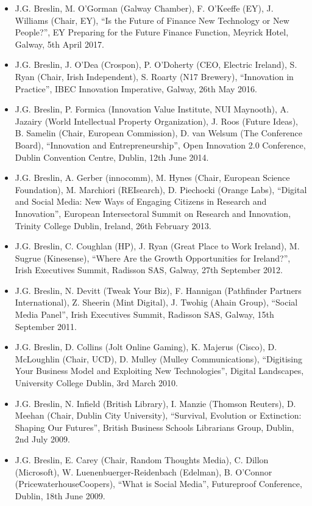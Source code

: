 \documentclass[10pt,a4paper]{res} %
\begin{document}
\begin{resume}
\begin{itemize}
\item J.G. Breslin, M. O'Gorman (Galway Chamber), F. O'Keeffe (EY), J. Williams (Chair, EY), ``Is the Future of Finance New Technology or New People?'', EY Preparing for the Future Finance Function, Meyrick Hotel, Galway, 5th April 2017.
\item J.G. Breslin, J. O'Dea (Crospon), P. O'Doherty (CEO, Electric Ireland), S. Ryan (Chair, Irish Independent), S. Roarty (N17 Brewery), ``Innovation in Practice'', IBEC Innovation Imperative, Galway, 26th May 2016.
\item J.G. Breslin, P. Formica (Innovation Value Institute, NUI Maynooth), A. Jazairy (World Intellectual Property Organization), J. Roos (Future Ideas), B. Samelin (Chair, European Commission), D. van Welsum (The Conference Board), ``Innovation and Entrepreneurship'', Open Innovation 2.0 Conference, Dublin Convention Centre, Dublin, 12th June 2014.
\item J.G. Breslin, A. Gerber (innocomm), M. Hynes (Chair, European Science Foundation), M. Marchiori (REIsearch), D. Piechocki (Orange Labs), ``Digital and Social Media: New Ways of Engaging Citizens in Research and Innovation'', European Intersectoral Summit on Research and Innovation, Trinity College Dublin, Ireland, 26th February 2013.
\item J.G. Breslin, C. Coughlan (HP), J. Ryan (Great Place to Work Ireland), M. Sugrue (Kinesense), ``Where Are the Growth Opportunities for Ireland?'', Irish Executives Summit, Radisson SAS, Galway, 27th September 2012.
\item J.G. Breslin, N. Devitt (Tweak Your Biz), F. Hannigan (Pathfinder Partners International), Z. Sheerin (Mint Digital), J. Twohig (Ahain Group), ``Social Media Panel'', Irish Executives Summit, Radisson SAS, Galway, 15th September 2011.
\item J.G. Breslin, D. Collins (Jolt Online Gaming), K. Majerus (Cisco), D. McLoughlin (Chair, UCD), D. Mulley (Mulley Communications), ``Digitising Your Business Model and Exploiting New Technologies'', Digital Landscapes, University College Dublin, 3rd March 2010.
\item J.G. Breslin, N. Infield (British Library), I. Manzie (Thomson Reuters), D. Meehan (Chair, Dublin City University), ``Survival, Evolution or Extinction: Shaping Our Futures'', British Business Schools Librarians Group, Dublin, 2nd July 2009.
\item J.G. Breslin, E. Carey (Chair, Random Thoughts Media), C. Dillon (Microsoft), W. Luenenbuerger-Reidenbach (Edelman), B. O'Connor (PricewaterhouseCoopers), ``What is Social Media'', Futureproof Conference, Dublin, 18th June 2009.

\end{itemize}
\end{resume}
\end{document}
